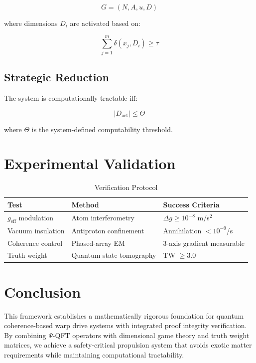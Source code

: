 \documentclass{article}
\begin{document}
\begin{equation}
G = (N, A, u, D)
\end{equation}

where dimensions $D_i$ are activated based on:

\begin{equation}
\sum_{j=1}^{m} \delta(x_j, D_i) \geq \tau
\end{equation}

\subsection{Strategic Reduction}

The system is computationally tractable iff:

\begin{equation}
|D_{\text{act}}| \leq \Theta
\end{equation}

where $\Theta$ is the system-defined computability threshold.

\section{Experimental Validation}

\begin{table}[h]
\centering
\caption{Verification Protocol}
\begin{tabular}{@{}lll@{}}
\toprule
\textbf{Test} & \textbf{Method} & \textbf{Success Criteria} \\
\midrule
$g_{\text{eff}}$ modulation & Atom interferometry & $\Delta g \geq 10^{-8}$ m/s$^2$ \\
Vacuum insulation & Antiproton confinement & Annihilation $< 10^{-9}$/s \\
Coherence control & Phased-array EM & 3-axis gradient measurable \\
Truth weight & Quantum state tomography & TW $\geq 3.0$ \\
\bottomrule
\end{tabular}
\end{table}

\section{Conclusion}

This framework establishes a mathematically rigorous foundation for quantum coherence-based warp drive systems with integrated proof integrity verification. By combining $\Psi$-QFT operators with dimensional game theory and truth weight matrices, we achieve a safety-critical propulsion system that avoids exotic matter requirements while maintaining computational tractability.
\end{document}
